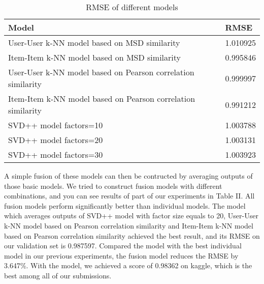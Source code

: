 \documentclass[10pt,conference,compsocconf]{IEEEtran}
\begin{document}
\begin{table}[h] 
\begin{tabular}{|l|l|}
\hline
\textbf{Model}                                                   & \textbf{RMSE} \\ \hline
User-User k-NN model based on MSD similarity                     & 1.010925     \\ \hline
Item-Item k-NN model based on MSD similarity                     & 0.995846     \\ \hline
User-User k-NN model based on Pearson correlation similarity     & 0.999997     \\ \hline
Item-Item k-NN model based on Pearson correlation similarity     & 0.991212     \\ \hline
SVD++ model factors=10                                           & 1.003788     \\ \hline
SVD++ model factors=20                                           & 1.003131     \\ \hline
SVD++ model factors=30                                           & 1.003923     \\ \hline
\end{tabular}
\caption{\label{tab:Table 1}RMSE of different models}
\end{table}

A simple fusion of these models can then be contructed by averaging outputs of those basic models. We tried to construct fusion models with different combinations, and you can see results of part of our experiments in Table II. All fusion models perform significantly better than individual models. The model which averages outputs of SVD++ model with factor size equals to 20, User-User k-NN model based on Pearson correlation similarity and Item-Item k-NN model based on Pearson correlation similarity achieved the best result, and its RMSE on our validation set is 0.987597. Compared the model with the best individual model in our previous experiments, the fusion model reduces the RMSE by 3.647\%. With the model, we achieved a score of 0.98362 on kaggle, which is the best among all of our submissions.
\end{document}
